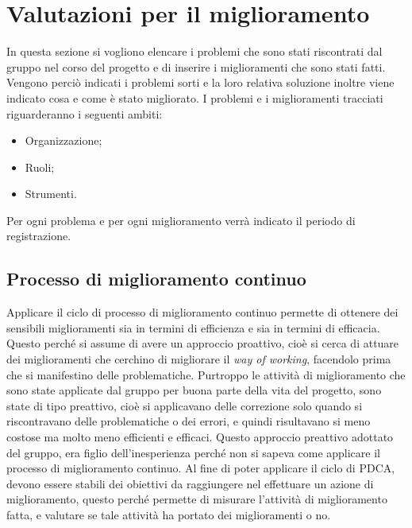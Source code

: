 \clearpage
\section{Valutazioni per il miglioramento}
In questa sezione si vogliono elencare i problemi che sono stati riscontrati dal gruppo nel corso del progetto e di inserire i miglioramenti che sono stati fatti. Vengono perciò indicati i problemi sorti e la loro relativa soluzione inoltre viene indicato cosa e come è stato migliorato.
I problemi e i miglioramenti tracciati riguarderanno i seguenti ambiti:
\begin{itemize}
\item Organizzazione;
\item Ruoli;
\item Strumenti.
\end{itemize}
Per ogni problema e per ogni miglioramento verrà indicato il periodo di registrazione.
\subsection{Processo di miglioramento continuo}
Applicare il ciclo di processo di miglioramento continuo permette di ottenere dei sensibili miglioramenti sia in termini di efficienza e sia in termini di efficacia. Questo perché si assume di avere un approccio proattivo, cioè si cerca di attuare dei miglioramenti che cerchino di migliorare il \textsl{way of working}, facendolo prima che si manifestino delle problematiche. Purtroppo le attività di miglioramento che sono state applicate dal gruppo per buona parte della vita del progetto, sono state di tipo preattivo, cioè si applicavano delle correzione solo quando si riscontravano delle problematiche o dei errori, e quindi risultavano si meno costose ma molto meno efficienti e efficaci. Questo approccio preattivo adottato del gruppo, era figlio dell'inesperienza perché non si sapeva come applicare il processo di miglioramento continuo. Al fine di poter applicare il ciclo di PDCA, devono essere stabili dei obiettivi da raggiungere nel effettuare un azione di miglioramento, questo perché permette di misurare l'attività di miglioramento fatta, e valutare se tale attività ha portato dei miglioramenti o no.
